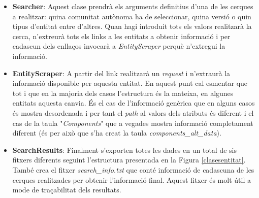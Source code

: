 \documentclass[12pt]{article}
\begin{document}
\begin{itemize}
    \item \textbf{Searcher}: Aquest clase prendrà els arguments definitius d'una de les cerques a realitzar: quina comunitat autònoma ha de seleccionar, quina versió o quin tipus d'entitat entre d'altres. Quan hagi introduit tots els valors realitzarà la cerca, n'extreurà tots els links a les entitats a obtenir informació i per cadascun dels enllaços invocarà a \textit{EntityScraper} perquè n'extregui la informació.
    \item \textbf{EntityScraper}: A partir del link realitzarà un \textit{request} i n'extraurà la informació disponible per aquesta entitat. En aquest punt cal esmentar que tot i que en la majoria dels casos l'estructura és la mateixa, en algunes entitats aquesta canvia. És el cas de l'informació genèrica que en alguns casos és mostra desordenada i per tant el \textit{path} al valors dels atributs és diferent i el cas de la taula "\textit{Components}" que a vegades mostra informació completament diferent (és per això que s'ha creat la taula \textit{components\_alt\_data}).
    \item \textbf{SearchResults}: Finalment s'exporten totes les dades en un total de sis fitxers diferents seguint l'estructura presentada en la Figura \ref{clasesentitat}. També crea el fitxer \textit{search\_info.txt} que conté informació de cadascuna de les cerques realitzades per obtenir l'informació final. Aquest fitxer és molt útil a mode de traçabilitat dels resultats.
\end{itemize}
\end{document}
